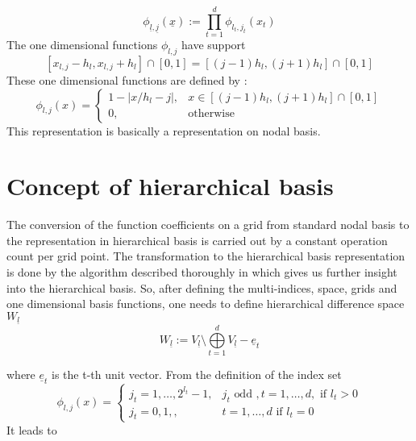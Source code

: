 \begin{equation}
    \phi_{\underline{l},\underline{j}} ( \underline{x} ) := \prod\limits_{t=1}^d \phi_{l_{t},j_{t}}(x_{t})
\end{equation}
The one dimensional functions $\phi_{l,j}$ have support
\begin{equation}
    \left[ x_{l,j} - h_{l}, x_{l,j} + h_{l} \right] \cap [0,1] = \left[ (j-1)h_{l}, (j+1)h_{l} \right] \cap [0,1]
\end{equation}
These one dimensional functions are defined by :
\begin{equation}
     \phi_{l,j} (x) =
     \begin{cases}
     1 - \left|x/h_{l} - j \right|, &  x \in \left[ (j-1)h_{l}, (j+1)h_{l} \right] \cap [0,1] \\
     0, & \text{otherwise}
     \end{cases}
\end{equation}
This representation is basically a representation on nodal basis.
\section{Concept of hierarchical basis}
The conversion of the function coefficients on a grid from standard nodal basis to the representation in hierarchical basis is carried out by a constant operation count per grid point. The transformation to the hierarchical basis representation is done by the algorithm described thoroughly in \cite{Griebel1992b} which gives us further insight into the hierarchical basis.  So, after defining the multi-indices, space, grids and one dimensional basis functions, one needs to define hierarchical difference space $W_{\underline{l}}$
\begin{equation}
     W_{\underline{l}} := V_{\underline{l}} \setminus \bigoplus\limits_{t=1}^{d} V_{\underline{l}} - \underline{e}_{t}
\end{equation}

where $\underline{e}_{t}$ is the t-th unit vector. From the definition of the index set
\begin{equation}
     \phi_{l,j} (x) =
     \begin{cases}
     j_{t} = 1,\dots,2^{l_{t}} -1, &  j_{t} \text{ odd }, t= 1,\dots,d, \text{ if } l_{t} > 0\\
     j_{t} = 0,1,, & t=1,\dots,d \text{ if } l_{t} = 0 
     \end{cases}
\end{equation}
It leads to 

